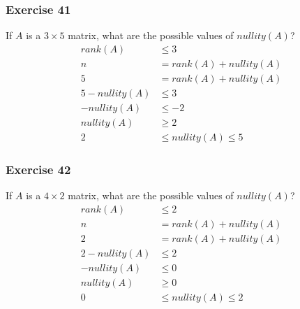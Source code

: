 \documentclass{math}
\begin{document}
\subsubsection*{Exercise 41}
If \( A \) is a \( 3\times5 \) matrix, what are the possible values of
\( nullity(A) \)?
\begin{align*}
  rank(A) &\le 3 \\
  n &= rank(A)+nullity(A) \\
  5 &= rank(A)+nullity(A) \\
  5-nullity(A) &\le 3 \\
  -nullity(A) &\le -2 \\
  nullity(A) &\ge 2 \\
  2 &\le nullity(A) \le 5
\end{align*}

\subsubsection*{Exercise 42}
If \( A \) is a \( 4\times2 \) matrix, what are the possible values of
\( nullity(A) \)?
\begin{align*}
  rank(A) &\le 2 \\
  n &= rank(A)+nullity(A) \\
  2 &= rank(A)+nullity(A) \\
  2-nullity(A) &\le 2 \\
  -nullity(A) &\le 0 \\
  nullity(A) &\ge 0 \\
  0 &\le nullity(A) \le 2
\end{align*}
\end{document}
